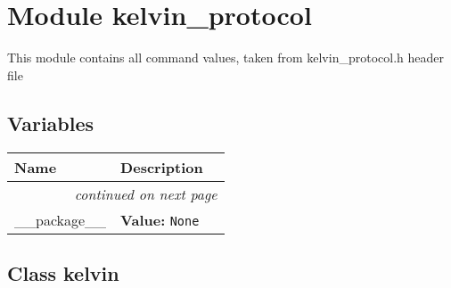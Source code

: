 %
%
%


\section{Module kelvin\_protocol}

    \label{kelvin_protocol}
This module contains all command values, taken from kelvin\_protocol.h 
header file



  \subsection{Variables}

    \vspace{-1cm}
\hspace{\varindent}\begin{longtable}{|p{\varnamewidth}|p{\vardescrwidth}|l}
\cline{1-2}
\cline{1-2} \centering \textbf{Name} & \centering \textbf{Description}& \\
\cline{1-2}
\endhead\cline{1-2}\multicolumn{3}{r}{\small\textit{continued on next page}}\\\endfoot\cline{1-2}
\endlastfoot\raggedright \_\-\_\-p\-a\-c\-k\-a\-g\-e\-\_\-\_\- & \raggedright \textbf{Value:} 
{\tt None}&\\
\cline{1-2}
\end{longtable}



\subsection{Class kelvin}

